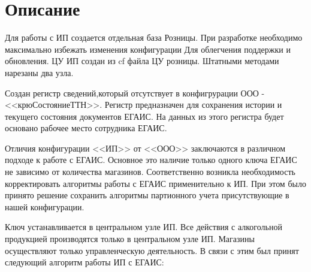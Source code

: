\section{Описание}

Для работы с ИП создается отдельная база Розницы. При разработке необходимо максимально избежать изменения конфигурации Для облегчения поддержки и обновления. ЦУ ИП создан из cf файла ЦУ розницы. Штатными методами нарезаны два узла.

Создан регистр сведений,который отсутствует в конфигрурации ООО - <<крюСостояниеТТН>>. Регистр предназначен для сохранения истории и текущего состояния документов ЕГАИС. На данных из этого регистра будет основано рабочее место сотрудника ЕГАИС.  \par

Отличия конфигурации <<ИП>> от <<ООО>> заключаются в различном подходе к работе с ЕГАИС.
 \framebox[0.65\textwidth][c]{\textcolor{blue}{И мы до сих пор не знаем есть ли отличия в торговле табаком!}} Основное это наличие только одного ключа ЕГАИС не зависимо от количества магазинов. Соответственно возникла необходимость корректировать алгоритмы работы с ЕГАИС применительно к ИП. При этом было принято решение сохранить алгоритмы партионного учета присутствующие в нашей конфигурации.\par
 Ключ устанавливается в центральном узле ИП. Все действия с алкогольной продукцией производятся только в центральном узле ИП. Магазины осуществляют только управленческую деятельность. В связи с этим  был принят следующий алгоритм работы ИП с ЕГАИС:
